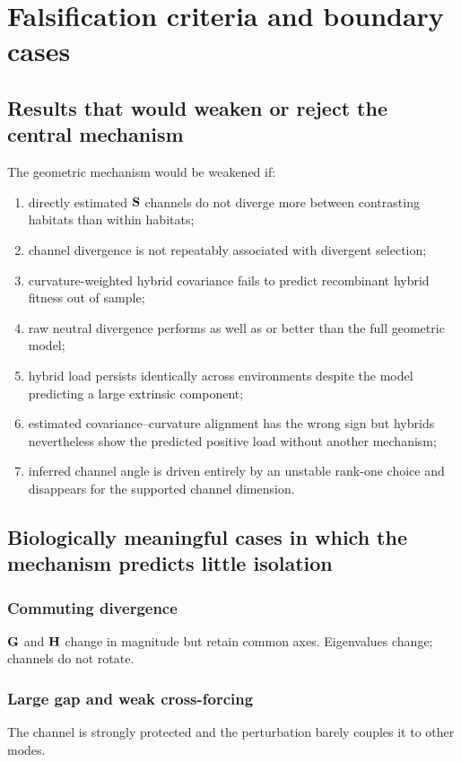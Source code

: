 \chapter{Falsification criteria and boundary cases}

\section{Results that would weaken or reject the central mechanism}

The geometric mechanism would be weakened if:
\begin{enumerate}[leftmargin=1.6em]
\item directly estimated \(\mathbf{S}\) channels do not diverge more between contrasting habitats than within habitats;
\item channel divergence is not repeatably associated with divergent selection;
\item curvature-weighted hybrid covariance fails to predict recombinant hybrid fitness out of sample;
\item raw neutral divergence performs as well as or better than the full geometric model;
\item hybrid load persists identically across environments despite the model predicting a large extrinsic component;
\item estimated covariance--curvature alignment has the wrong sign but hybrids nevertheless show the predicted positive load without another mechanism;
\item inferred channel angle is driven entirely by an unstable rank-one choice and disappears for the supported channel dimension.
\end{enumerate}

\section{Biologically meaningful cases in which the mechanism predicts little isolation}

\subsection{Commuting divergence}
\(\mathbf{G}\) and \(\mathbf{H}\) change in magnitude but retain common axes. Eigenvalues change; channels do not rotate.

\subsection{Large gap and weak cross-forcing}
The channel is strongly protected and the perturbation barely couples it to other modes.

